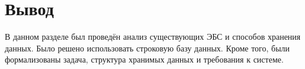 \section*{Вывод}

В данном разделе был проведён анализ существующих ЭБС и способов хранения данных. Было решено использовать строковую базу данных. Кроме того, были формализованы задача, структура хранимых данных и требования к системе.

